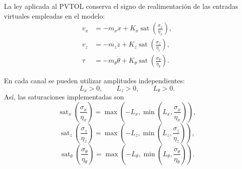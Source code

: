 La ley aplicada al PVTOL conserva el signo de realimentación de las entradas
virtuales empleadas en el modelo:
\begin{align*}
  v_x&=-m_x\dot x
  +K_x\operatorname{sat}\left(\frac{\sigma_x}{\eta_x}\right),\\
  v_z&=-m_z\dot z
  +K_z\operatorname{sat}\left(\frac{\sigma_z}{\eta_z}\right),\\
  \tau&=-m_\theta\dot\theta
  +K_\theta\operatorname{sat}\left(\frac{\sigma_\theta}{\eta_\theta}\right).
\end{align*}

En cada canal se pueden utilizar amplitudes independientes:
\[
  L_x>0,\qquad L_z>0,\qquad L_\theta>0.
\]
Así, las saturaciones implementadas son
\[
  \operatorname{sat}_x\left(\frac{\sigma_x}{\eta_x}\right)
  =
  \max\left(-L_x,\min\left(L_x,\frac{\sigma_x}{\eta_x}\right)\right),
\]
\[
  \operatorname{sat}_z\left(\frac{\sigma_z}{\eta_z}\right)
  =
  \max\left(-L_z,\min\left(L_z,\frac{\sigma_z}{\eta_z}\right)\right),
\]
\[
  \operatorname{sat}_\theta\left(\frac{\sigma_\theta}{\eta_\theta}\right)
  =
  \max\left(-L_\theta,
  \min\left(L_\theta,\frac{\sigma_\theta}{\eta_\theta}\right)\right).
\]